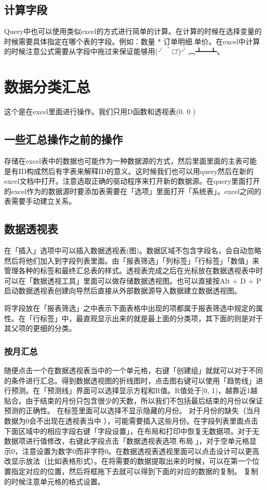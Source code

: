 \documentclass[10pt, a4paper]{article}
\begin{document}
        \subsection{计算字段}
            Query中也可以使用类似excel的方式进行简单的计算。在计算的时候在选择变量的时候需要具体指定在哪个表的字段。例如：数量 * 订单明细.单价。在excel中计算的时候注意公式需要从字段中拖过来保证能够用(╯‵□′)╯︵┻━┻。
    
    \section{数据分类汇总}
        这个是在excel里面进行操作。我们只用D函数和透视表(0. 0 )
        \subsection{一些汇总操作之前的操作}
        存储在excel表中的数据也可能作为一种数据源的方式，然后里面里面的主表可能是有ID构成然后有字表来解释ID的意义。这时候我们也可以用query然后在新的excel文档中打开。注意选取正确的驱动程序来打开新的数据源。在query里面打开的excel作为的数据源时要添加表需要在「选项」里面打开「系统表」。excel之间的表需要手动建立关系。

        \subsection{数据透视表}
            在「插入」选项中可以插入数据透视表(图)。数据区域不包含字段名，会自动忽略然后将他们加入到字段列表里面。由「报表筛选」「列标签」「行标签」「数值」来管理各种的标签和最终汇总表的样式。透视表完成之后在光标放在数据透视表中时可以在「数据透视工具」里面可以做存储数据透视图。也可以直接按Alt + D + P启动数据透视表创建向导然后直接从外部数据源导入数据建立数据透视图。

            将字段放在「报表筛选」之中表示下面表格中出现的项都属于报表筛选中规定的属性。在「行标签」中，最直观显示出来的就是最上面的分类项，其下面的则是对于其父项的更细的分类。

            \subsubsection{按月汇总}
            随便点击一个在数据透视表当中的一个单元格，右键「创建组」就就可以对于不同的条件进行汇总。得到数据透视图的折线图时，点击图右键可以使用「趋势线」进行预测。在「预测线」界面可以选择显示方程和R值。R值处于[0, 1)，越靠近1越贴合。由于结束的月份只包含很少的天数，所以我们不包括最后结束的月份以保证预测的正确性。 在标签里面可以选择不显示隐藏的月份。 对于月份的缺失（当月数据为0会不出现在透视表当中 ），可能需要插入这些月份。在字段列表里面点击下面区域中的相应字段右键「字段设置」，在布局和打印中恢复无数据项。对于无数据项进行值修改，右键此字段点击「数据透视表选项.布局 」，对于空单元格显示0，注意设置为数字0而非字符0。在数据透视表透视里面可以点击设计可以更高改显示放法（比如表格形式）。在将需要的数据提取出来的时候，可以在第一个位置指定对应的位置，然后将框拖下去就可以得到下面的对应的数据的复制。 复制的时候注意单元格的格式设置。
\end{document}
